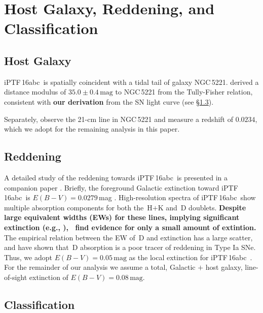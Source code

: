 \documentclass[twocolumn]{aastex61}
\newcommand{\abc}{iPTF\,16abc}
\begin{document}
\section{Host Galaxy, Reddening, and Classification}
\label{sec:usual_staff}

\subsection{Host Galaxy}
\label{sec:host}

\abc\ is spatially coincident with a tidal tail of galaxy NGC\,5221.
\citet{2007A&A...465...71T} derived a distance modulus of
$35.0\pm0.4\,\textrm{mag}$ to NGC\,5221 from the Tully-Fisher relation,
consistent with \textbf{our derivation} from the SN light curve (see
\S\ref{sec:classification}).

Separately, \citet{2015MNRAS.447.1531C} observe the 21-cm line in NGC\,5221
and measure a redshift of $0.0234$, which we adopt for the remaining analysis
in this paper.

\subsection{Reddening}
\label{sec:reddening}

A detailed study of the reddening towards \abc\ is presented in a companion
paper \citep{2017A&A...606A.111F}. Briefly, the foreground Galactic extinction
toward \abc\ is $E(B-V) = 0.0279$\,mag \citep{2011ApJ...737..103S}.
High-resolution spectra of \abc\ show multiple absorption components for both
the \,H$+$K and \,D doublets. \textbf{Despite large
equivalent widths (EWs) for these lines, implying significant extinction
(e.g., \citealt{2012MNRAS.426.1465P}), \citeauthor{2017A&A...606A.111F}~find
evidence for only a small amount of extintion.} The empirical relation between
the EW of \,D and extinction has a large scatter, and
\citet{2013ApJ...779...38P} have shown that \,D absorption is a
poor tracer of reddening in Type Ia SNe. Thus, we adopt $E(B-V) = 0.05 \,
\mathrm{mag}$ as the local extinction for \abc\ \citep{2017A&A...606A.111F}.
For the remainder of our analysis we assume a total, Galactic $+$ host galaxy,
line-of-sight extinction of $E(B-V) = 0.08 \, \mathrm{mag}$.

\subsection{Classification}
\label{sec:classification}
\end{document}
